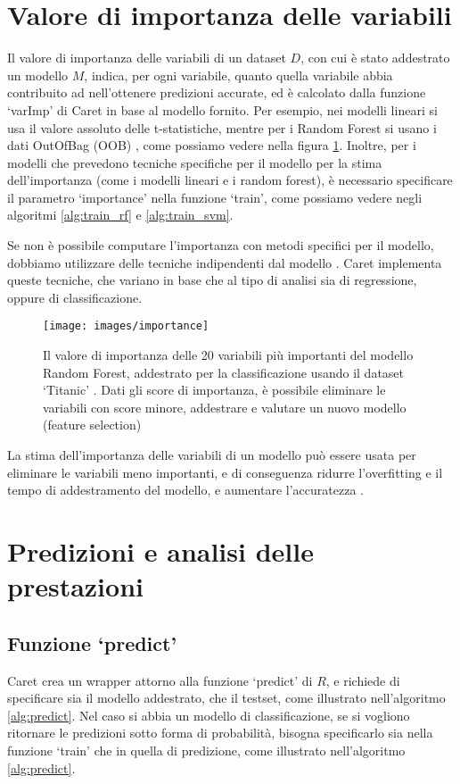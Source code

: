 \documentclass[12pt]{article}
\begin{document}
\section{Valore di importanza delle variabili}
\label{sec:imp}
Il valore di importanza delle variabili di un dataset $D$, con cui è stato addestrato un modello $M$, indica, per ogni variabile, quanto quella variabile abbia contribuito ad 
nell'ottenere predizioni accurate, ed è calcolato dalla funzione ‘varImp’ di Caret in base al modello fornito. Per esempio, nei modelli lineari si usa il valore assoluto delle t-statistiche, 
mentre per i Random Forest si usano i dati OutOfBag (OOB) \cite{caret:repo}, come possiamo vedere nella figura \ref{img:importance}. 
Inoltre, per i modelli che prevedono tecniche specifiche per il modello per la stima dell'importanza (come i modelli lineari e i random forest), è necessario specificare il parametro ‘importance’ nella funzione ‘train’, come possiamo vedere negli algoritmi \ref{alg:train_rf} e \ref{alg:train_svm}.

Se non è possibile computare l'importanza con metodi specifici per il modello, dobbiamo utilizzare delle tecniche indipendenti dal modello \cite{caret:repo}.
 Caret implementa queste tecniche, che variano in base che al tipo di analisi sia di regressione, oppure di classificazione.

\begin{figure}[H]
    \centering
    \texttt{[image: images/importance]}
    \caption{Il valore di importanza delle 20 variabili più importanti del modello Random Forest, addestrato per la classificazione usando il dataset ‘Titanic’ \cite{cit:titanic}. 
    Dati gli score di importanza, è possibile eliminare le variabili con score minore, addestrare e valutare un nuovo modello (feature selection)} 
    \label{img:importance}
\end{figure}

La stima dell'importanza delle variabili di un modello può essere usata per eliminare le variabili meno importanti, e di conseguenza ridurre l'overfitting e il tempo di addestramento del modello, e aumentare l'accuratezza \cite{cit:featureSelection}.

\section{Predizioni e analisi delle prestazioni}
\label{sec:pred}
\subsection{Funzione ‘predict’}
Caret crea un wrapper attorno alla funzione ‘predict’ di $R$, e richiede di specificare sia il modello addestrato, che il testset, come illustrato nell'algoritmo \ref{alg:predict}. 
Nel caso si abbia un modello di classificazione, se si vogliono ritornare le predizioni sotto forma di probabilità, bisogna specificarlo sia nella funzione ‘train’ che in quella di predizione, come illustrato nell'algoritmo \ref{alg:predict}.
\end{document}
